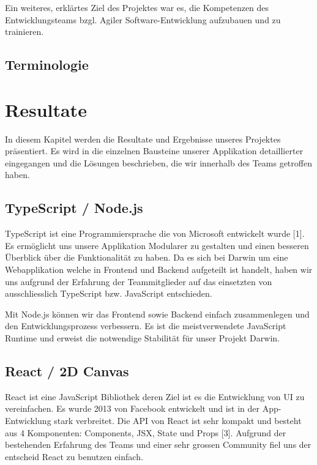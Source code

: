 \documentclass[11pt,a4paper,titlepage]{article}
\begin{document}
Ein weiteres, erklärtes Ziel des Projektes war es, die Kompetenzen des Entwicklungsteams bzgl. Agiler Software-Entwicklung aufzubauen und zu trainieren.

\subsection{Terminologie}


\section{Resultate}
In diesem Kapitel werden die Resultate und Ergebnisse unseres Projektes präsentiert.
Es wird in die einzelnen Bausteine unserer Applikation detaillierter eingegangen und die Lösungen beschrieben, die wir innerhalb des Teams getroffen haben.

\subsection{TypeScript / Node.js}
TypeScript ist eine Programmiersprache die von Microsoft entwickelt wurde [1]. Es ermöglicht uns unsere Applikation Modularer zu gestalten und einen besseren Überblick über die Funktionalität zu haben.
Da es sich bei Darwin um eine Webapplikation welche in Frontend und Backend aufgeteilt ist handelt, haben wir uns aufgrund der Erfahrung der Teammitglieder auf das einsetzten von ausschliesslich TypeScript bzw. JavaScript entschieden.

Mit Node.js können wir das Frontend sowie Backend einfach zusammenlegen und den Entwicklungsprozess verbessern. Es ist die meistverwendete JavaScript Runtime und erweist die notwendige Stabilität für unser Projekt Darwin.

\subsection{React / 2D Canvas}
React ist eine JavaScript Bibliothek deren Ziel ist es die Entwicklung von UI zu vereinfachen. Es wurde 2013 von Facebook entwickelt und ist in der App-Entwicklung stark verbreitet.
Die API von React ist sehr kompakt und besteht aus 4 Komponenten: Components, JSX, State und Props [3].
Aufgrund der bestehenden Erfahrung des Teams und einer sehr grossen Community fiel uns der entscheid React zu benutzen einfach.
\end{document}
